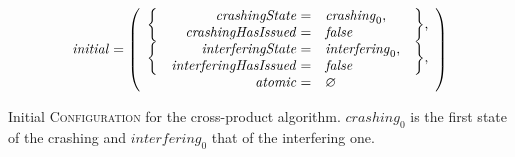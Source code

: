 \begin{sanefig}
  \begin{displaymath}
    \mathit{initial} = \left(\begin{array}{rrll}
      \multirow{2}{*}{\bigg\{} & \mathit{crashingState} = & \mathit{crashing}_0, & \multirow{2}{*}{\bigg\},} \\
                               & \mathit{crashingHasIssued} = & \false\\
      \multirow{2}{*}{\bigg\{} & \mathit{interferingState} = & \mathit{interfering}_0, & \multirow{2}{*}{\bigg\},} \\
                               & \mathit{interferingHasIssued} = & \false\\
      \multicolumn{2}{r}{\mathit{atomic} = } & \varnothing \\
    \end{array}\right)
  \end{displaymath}
  \caption{Initial \textsc{Configuration} for the cross-product
    algorithm.  $\mathit{crashing}_0$ is the first state of the
    crashing {\StateMachine} and $\mathit{interfering}_0$ that of the
    interfering one.}
  \label{fig:cross_product:initial}
\end{sanefig}

